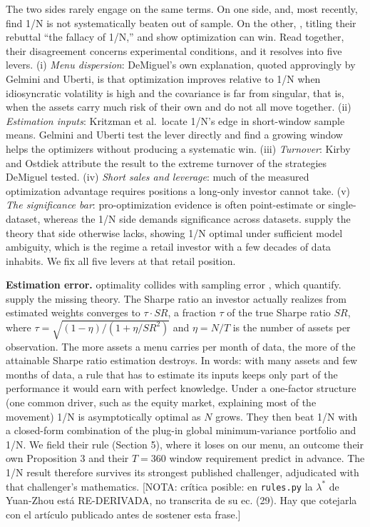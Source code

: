 \documentclass[12pt,letterpaper]{article}
\newcommand{\nuevo}[1]{{\color{nuevoc}#1}}
\newcommand{\nota}[1]{{\color{notac}\sffamily\small [NOTA: #1]}}
\newcommand{\head}[1]{\noindent\textbf{#1}\hspace{0.5em}\ignorespaces}
\begin{document}
The two sides rarely engage on the same terms. On one side, \citet{demiguel2009}
and, most recently, \citet{gelmini2024} find 1/N is not systematically beaten out
of sample. On the other, \citet{kritzman2010}, titling their rebuttal ``the
fallacy of 1/N,'' and \citet{kirby2012} show optimization can win. Read together,
their disagreement concerns experimental conditions, and it resolves into five
levers. (i) \emph{Menu dispersion}: DeMiguel's own explanation, quoted approvingly
by Gelmini and Uberti, is that optimization improves relative to 1/N when
idiosyncratic volatility is high and the covariance is far from singular\nuevo{, that is,
when the assets carry much risk of their own and do not all move together}.
(ii) \emph{Estimation inputs}: Kritzman et al.\ locate 1/N's edge in short-window
sample means. Gelmini and Uberti test the lever directly and find a growing window
helps the optimizers without producing a systematic win. (iii) \emph{Turnover}:
Kirby and Ostdiek attribute the result to the extreme turnover of the strategies
DeMiguel tested. (iv) \emph{Short sales and leverage}: much of the measured
optimization advantage requires positions a long-only investor cannot take.
(v) \emph{The significance bar}: pro-optimization evidence is often point-estimate
or single-dataset, whereas the 1/N side demands significance across datasets.
\citet{pflug2012} supply the theory that side otherwise lacks, showing 1/N
optimal under sufficient model ambiguity, which is the regime a retail investor
with a few decades of data inhabits. We fix all five levers at that retail
position.

\head{Estimation error.} \citet{markowitz1952} optimality collides with sampling
error \citep{michaud1989,chopra1993}, which \citet{demiguel2009} quantify.
\citet{yuan2023} supply the missing theory. The Sharpe ratio an investor actually realizes from estimated weights converges to
$\tau \cdot SR$, a fraction $\tau$ of the true Sharpe ratio $SR$, where
$\tau = \sqrt{(1-\eta)/(1+\eta/SR^{2})}$ and $\eta = N/T$ is the number of assets per
observation. The more assets a menu carries per month of data, the more of the attainable
Sharpe ratio estimation destroys.\nuevo{ In words: with many assets and few months of data, a
rule that has to estimate its inputs keeps only part of the performance it would earn with
perfect knowledge.} Under a one-factor structure\nuevo{ (one common driver, such as the equity
market, explaining most of the movement)} 1/N is asymptotically
optimal as $N$ grows. They
then beat 1/N with a closed-form combination of the plug-in global
minimum-variance portfolio and 1/N. We field their rule (Section 5), where it
loses on our menu, an outcome their own Proposition 3 and their $T = 360$ window
requirement predict in advance. The 1/N result therefore survives its
strongest published challenger, adjudicated with that challenger's mathematics.
\nota{cr\'itica posible: en \texttt{rules.py} la $\lambda^{*}$ de Yuan-Zhou est\'a RE-DERIVADA, no transcrita de su ec. (29). Hay que cotejarla con el art\'iculo publicado antes de sostener esta frase.}
\end{document}
